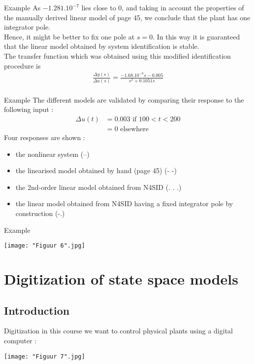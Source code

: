 \begin{frame}{Example}
As $−1.281.10^{−7}$ lies close to 0, and taking in account the properties of the manually derived linear model of page 45, we conclude that the plant has one integrator pole.\\ \vspace{0.3cm}
Hence,
it might be better to fix one pole at $s = 0$. In this way
it is guaranteed that the linear model obtained by system
identification is stable.\\\vspace{0.3cm}
The transfer function which was obtained using this modified
identification procedure is
\begin{align*}
\frac{\Delta y(s)}{\Delta u(s)} = \frac{-1.68.10^{-8}s-0.005}{s^2+0.1051s}\\
\end{align*}
\end{frame}


\begin{frame}{Example}
The different models are validated by comparing their response
to the following input :
\begin{align*}
\Delta u(t) &= 0.003\text{ if }100<t<200\\
&=0\text{ elsewhere}
\end{align*}
Four responses are shown :
\begin{itemize}
\item the nonlinear system (--)
\item the linearised model obtained by hand (page 45) (- -)
\item the 2nd-order linear model obtained from N4SID (. . .)
\item the linear model obtained from N4SID having a fixed
integrator pole by construction (-.)
\end{itemize}
\end{frame}

\begin{frame}{Example}
\begin{center}
\texttt{[image: "Figuur 6".jpg]}
\end{center}
\end{frame}

\newpage
\section{Digitization of state space models}
\subsection{Introduction}
\begin{frame}{Digitization}
in this course we want to control physical plants using a
digital computer :

\begin{center}
\texttt{[image: "Figuur 7".jpg]}
\end{center}
\end{frame}

